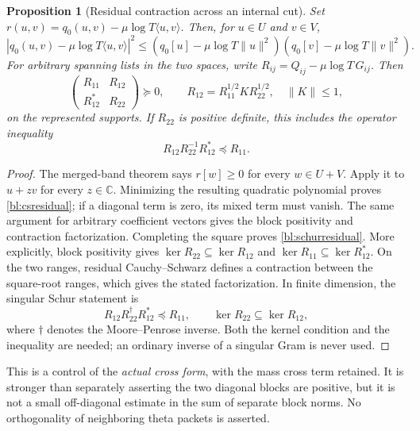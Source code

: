 \documentclass[11pt,a4paper]{article}
\numberwithin{equation}{section}
\newtheorem{proposition}[theorem]{Proposition}
\theoremstyle{definition}\newtheorem{definition}[theorem]{Definition}
\theoremstyle{remark}\newtheorem{remark}[theorem]{Remark}
\newcommand{\R}{\mathbb R}\newcommand{\C}{\mathbb C}\newcommand{\N}{\mathbb N}
\newcommand{\ip}[2]{\langle#1,#2\rangle}\newcommand{\norm}[1]{\lVert#1\rVert}\newcommand{\abs}[1]{\lvert#1\rvert}
\begin{document}
\begin{proposition}[Residual contraction across an internal cut]\label{bl:adjacent}
Set $r(u,v)=q_0(u,v)-\mu\log T\ip uv$. Then, for $u\in U$ and $v\in V$,
\begin{equation}\label{bl:csresidual}
 \boxed{|q_0(u,v)-\mu\log T\ip uv|^2
 \le(q_0[u]-\mu\log T\norm u^2)
      (q_0[v]-\mu\log T\norm v^2).}
\end{equation}
For arbitrary spanning lists in the two spaces, write $R_{ij}=Q_{ij}-\mu\log T\,G_{ij}$. Then
\begin{equation}\label{bl:blockresidual}
 \begin{pmatrix}R_{11}&R_{12}\\R_{12}^*&R_{22}\end{pmatrix}\succeq0,
 \qquad R_{12}=R_{11}^{1/2}K R_{22}^{1/2},\quad\norm K\le1,
\end{equation}
on the represented supports. If $R_{22}$ is positive definite, this includes the operator inequality
\begin{equation}\label{bl:schurresidual}
 R_{12}R_{22}^{-1}R_{12}^*\preceq R_{11}.
\end{equation}
\end{proposition}
\begin{proof}
The merged-band theorem says $r[w]\ge0$ for every $w\in U+V$. Apply it to $u+zv$ for every $z\in\C$. Minimizing the resulting quadratic polynomial proves \eqref{bl:csresidual}; if a diagonal term is zero, its mixed term must vanish. The same argument for arbitrary coefficient vectors gives the block positivity and contraction factorization. Completing the square proves \eqref{bl:schurresidual}. More explicitly, block positivity gives $\ker R_{22}\subseteq\ker R_{12}$ and $\ker R_{11}\subseteq\ker R_{12}^*$. On the two ranges, residual Cauchy--Schwarz defines a contraction between the square-root ranges, which gives the stated factorization. In finite dimension, the singular Schur statement is
\[
 R_{12}R_{22}^{\dagger}R_{12}^*\preceq R_{11},\qquad
 \ker R_{22}\subseteq\ker R_{12},
\]
where $\dagger$ denotes the Moore--Penrose inverse. Both the kernel condition and the inequality are needed; an ordinary inverse of a singular Gram is never used.
\end{proof}

This is a control of the \emph{actual cross form}, with the mass cross term retained. It is stronger than separately asserting the two diagonal blocks are positive, but it is not a small off-diagonal estimate in the sum of separate block norms. No orthogonality of neighboring theta packets is asserted.
\end{document}
